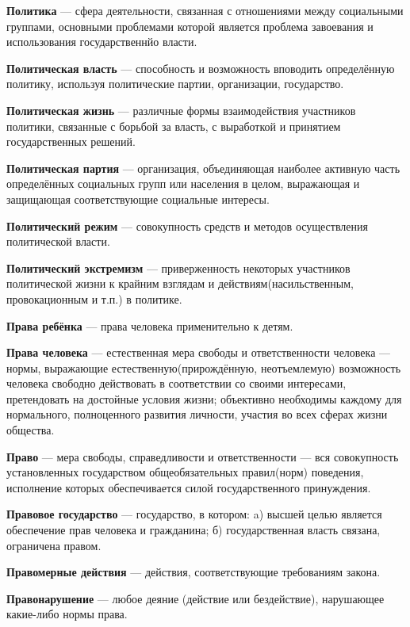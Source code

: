 \documentclass[a4paper, 12pt]{article}
\begin{document}
        \textbf{Политика} --- сфера деятельности, связанная с отношениями между социальными группами, основными проблемами которой является проблема завоевания и использования государственнйо власти. \par
        \textbf{Политическая власть} --- способность и возможность вповодить определённую политику, используя политические партии, организации, государство. \par
        \textbf{Политическая жизнь} --- различные формы взаимодействия участников политики, связанные с борьбой за власть, с выработкой и принятием государственных решений.  \par
        \textbf{Политическая партия} --- организация, объединяющая наиболее активную часть определённых социальных групп или населения в целом, выражающая и защищающая соответствующие социальные интересы. \par
        \textbf{Политический режим} --- совокупность средств и методов осуществления политической власти. \par
        \textbf{Политический экстремизм} --- приверженность некоторых участников политической жизни к крайним взглядам и действиям(насильственным, провокационным и т.п.) в политике. \par
        \textbf{Права ребёнка} --- права человека применительно к детям. \par
        \textbf{Права человека} --- естественная мера свободы и ответственности человека --- нормы, выражающие естественную(прирождённую, неотъемлемую) возможность человека свободно действовать в соответствии со своими интересами, претендовать на достойные условия жизни; объективно необходимы каждому для нормального, полноценного развития личности, участия во всех сферах жизни общества. \par
        \textbf{Право} --- мера свободы, справедливости и ответственности --- вся совокупность установленных государством общеобязательных правил(норм) поведения, исполнение которых обеспечивается силой государственного принуждения. \par
        \textbf{Правовое государство} --- государство, в котором: a) высшей целью является обеспечение прав человека и гражданина; б) государственная власть связана, ограничена правом. \par
        \textbf{Правомерные действия} --- действия, соответствующие требованиям закона. \par
        \textbf{Правонарушение} --- любое деяние (действие или бездействие), нарушающее какие-либо нормы права. \par
\end{document}

